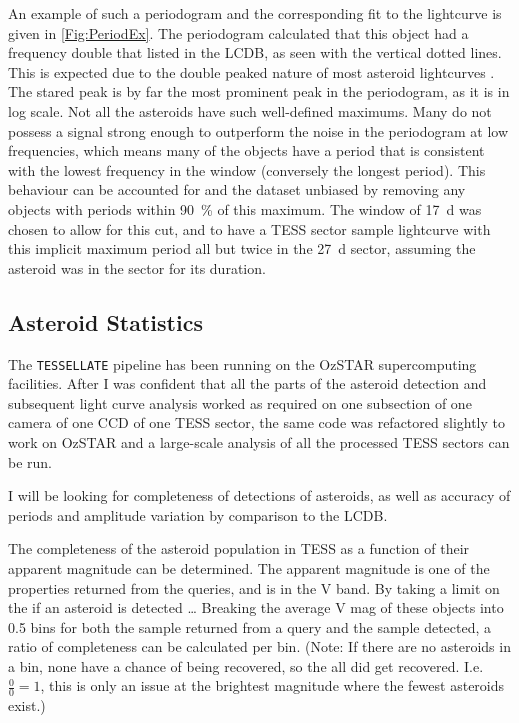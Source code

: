 \documentclass{UCreport}
\begin{document}
An example of such a periodogram and the corresponding fit to the lightcurve is given in \autoref{Fig:PeriodEx}. 
The periodogram calculated that this object had a frequency double that listed in the LCDB, as seen with the vertical dotted lines. 
This is expected due to the double peaked nature of most asteroid lightcurves \citep{McNeill2023}.  
The stared peak is by far the most prominent peak in the periodogram, as it is in log scale.
Not all the asteroids have such well-defined maximums. 
Many do not possess a signal strong enough to outperform the noise in the periodogram at low frequencies, which means many of the objects have a period that is consistent with the lowest frequency in the window (conversely the longest period). 
This behaviour can be accounted for and the dataset unbiased by removing any objects with periods within \qty{90}{\percent} of this maximum. 
The window of \qty{17}{\day} was chosen to allow for this cut, and to have a TESS sector sample lightcurve with this implicit maximum period all but twice in the \qty{27}{\day} sector, assuming the asteroid was in the sector for its duration.  


\subsection{Asteroid Statistics}\label{SubSec:StatMeth}

The \texttt{TESSELLATE} pipeline has been running on the OzSTAR supercomputing facilities.
After I was confident that all the parts of the asteroid detection and subsequent light curve analysis worked as required on one subsection of one camera of one CCD of one TESS sector, the same code was refactored slightly to work on OzSTAR and a large-scale analysis of all the processed TESS sectors can be run.

I will be looking for completeness of detections of asteroids, as well as accuracy of periods and amplitude variation by comparison to the LCDB.

The completeness of the asteroid population in TESS as a function of their apparent magnitude can be determined.
The apparent magnitude is one of the properties returned from the queries, and is in the V band.
By taking a limit on the if an asteroid is detected \dots %
Breaking the average V mag of these objects into \qty{0.5}{\mag} bins for both the sample returned from a query and the sample detected, a ratio of completeness can be calculated per bin.
(Note: If there are no asteroids in a bin, none have a chance of being recovered, so the all did get recovered. I.e. $\frac{0}{0}=1$, this is only an issue at the brightest magnitude where the fewest asteroids exist.)
\end{document}

